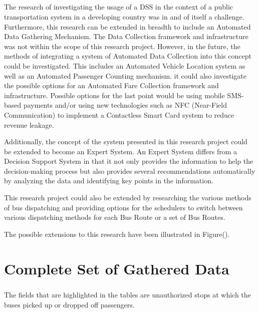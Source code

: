 \documentclass[12pt, oneside]{report}
\begin{document}
\paragraph{} The research of investigating the usage of a DSS in the context of a public transportation system in a developing country was in and of itself a challenge. Furthermore, this research can be extended in breadth to include an Automated Data Gathering Mechanism. The Data Collection framework and infrastructure was not within the scope of this research project. However, in the future, the methods of integrating a system of Automated Data Collection into this concept could be investigated. This includes an Automated Vehicle Location system as well as an Automated Passenger Counting mechanism. it could also investigate the possible options for an Automated Fare Collection framework and infrastructure. Possible options for the last point would be using mobile SMS-based payments and/or using new technologies such as NFC (Near-Field Communication) to implement a Contactless Smart Card system to reduce revenue leakage.

Additionally, the concept of the system presented in this research project could be extended to become an Expert System. An Expert System differs from a Decision Support System in that it not only provides the information to help the decision-making process but also provides several recommendations automatically by analyzing the data and identifying key points in the information.

This research project could also be extended by researching the various methods of bus dispatching and providing options for the schedulers to switch between various dispatching methods for each Bus Route or a set of Bus Routes.

The possible extensions to this research have been illustrated in Figure().


\newpage


\appendix
\chapter{Complete Set of Gathered Data}
\label{appendix-CompleteSetOfData}

\paragraph{ } The fields that are highlighted in the tables are unauthorized stops at which the buses picked up or dropped off passengers.
\end{document}
